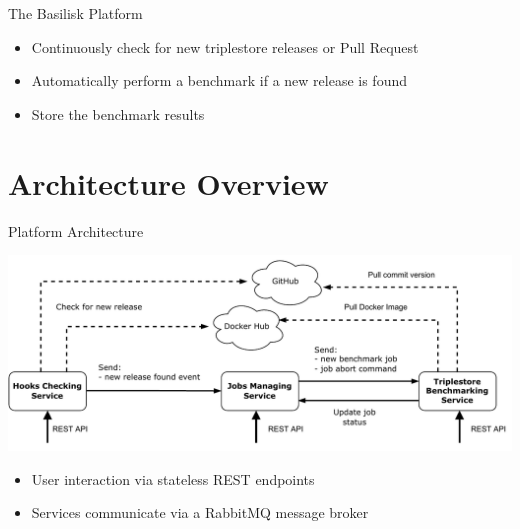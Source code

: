 \begin{frame}{The Basilisk Platform}
	\begin{itemize}
		\item Continuously check for new triplestore releases or Pull Request
		\item Automatically perform a benchmark if a new release is found
		\item Store the benchmark results
	\end{itemize}
	
	
\end{frame}

\section{Architecture Overview}
\begin{frame}{Platform Architecture}
	\centering
	
	\includegraphics[width=1\textwidth]{images/basilisk/high-level-design-approach.pdf}
	
	\begin{itemize}
		\item User interaction via stateless REST endpoints
		\item Services communicate via a RabbitMQ message broker
	\end{itemize}
	
\end{frame}